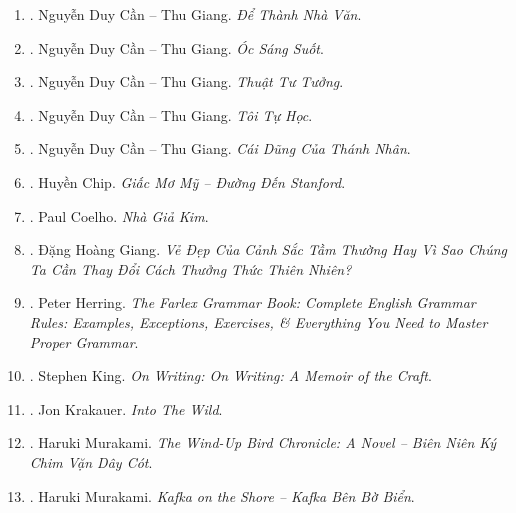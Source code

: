 \documentclass{article}
\begin{document}
\begin{enumerate}
	\item \cite{Can_dtnv}. {\sc Nguyễn Duy Cần -- Thu Giang}. {\it Để Thành Nhà Văn}.\hfill{\sf[done]}
	
	\item \cite{Can_oss}. {\sc Nguyễn Duy Cần -- Thu Giang}. {\it Óc Sáng Suốt}.\hfill{\sf[done]}
	
	\item \cite{Can_ttt}. {\sc Nguyễn Duy Cần -- Thu Giang}. {\it Thuật Tư Tưởng}.\hfill{\sf[reading]}
	
	\item \cite{Can_tth}. {\sc Nguyễn Duy Cần -- Thu Giang}. {\it Tôi Tự Học}.\hfill{\sf[reading]}
	
	\item \cite{Can_dung_thanh_nhan}. {\sc Nguyễn Duy Cần -- Thu Giang}. {\it Cái Dũng Của Thánh Nhân}.\hfill{\sf[done]}
	
	\item \cite{Chip_US_dream}. {\sc Huyền Chip}. {\it Giấc Mơ Mỹ -- Đường Đến Stanford}.\hfill{\sf[done]}
	
	\item \cite{Coelho_alchemist_VN}. {\sc Paul Coelho}. {\it Nhà Giả Kim}.\hfill{\sf[done]}
	
	\item \cite{Giang_nature}. {\sc Đặng Hoàng Giang}. {\it Vẻ Đẹp Của Cảnh Sắc Tầm Thường Hay Vì Sao Chúng Ta Cần Thay Đổi Cách Thưởng Thức Thiên Nhiên?}\hfill{\sf[done]}
	
	\item \cite{Herring2016}. {\sc Peter Herring}. {\it The Farlex Grammar Book: Complete English Grammar Rules: Examples, Exceptions, Exercises, \& Everything You Need to Master Proper Grammar}.\hfill{\sf[reading]}
	
	\item \cite{King2000, King2010}. Stephen King. {\it On Writing: On Writing: A Memoir of the Craft}.\hfill{\sf[done]}
	
	\item \cite{Krakauer_wild}. {\sc Jon Krakauer}. {\it Into The Wild}.
	
	\item \cite{Murakami_bird}. Haruki Murakami. {\it The Wind-Up Bird Chronicle: A Novel -- Biên Niên Ký Chim Vặn Dây Cót}.\hfill{\sf[done]}
	
	\item \cite{Murakami_Kafka}. Haruki Murakami. {\it Kafka on the Shore -- Kafka Bên Bờ Biển}.\hfill{\sf[done]}
	

\end{enumerate}
\end{document}
